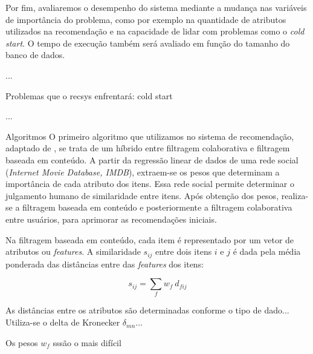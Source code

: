 Por fim, avaliaremos o desempenho do sistema mediante a mudança nas variáveis de importância do problema, como por exemplo na quantidade de atributos utilizados na recomendação e na capacidade de lidar com problemas como o \textit{cold start}. O tempo de execução também será avaliado em função do tamanho do banco de dados.

...

Problemas que o recsys enfrentará: cold start

...

Algoritmos
O primeiro algoritmo que utilizamos no sistema de recomendação, adaptado de  \cite{symeonidis2007feature}, se trata de um híbrido entre filtragem colaborativa e filtragem baseada em conteúdo. A partir da regressão linear de dados de uma rede social (\textit{Internet Movie Database, IMDB}), extraem-se os pesos que determinam a importância de cada atributo dos itens. Essa rede social permite determinar o julgamento humano de similaridade entre itens. Após obtenção dos pesos, realiza-se a filtragem baseada em conteúdo e posteriormente a filtragem colaborativa entre usuários, para aprimorar as recomendações iniciais.

Na filtragem baseada em conteúdo, cada item é representado por um vetor de atributos ou \textit{features}. A similaridade $s_{ij}$ entre dois itens $i$ e $j$ é dada pela média ponderada das distâncias entre das \textit{features} dos itens:

\begin{equation} 
    s_{ij} = \sum_{f}{w_{f} ~ d_{fij}}
\end{equation}

As distâncias entre os atributos são determinadas conforme o tipo de dado... Utiliza-se o delta de Kronecker $\delta_{mn}$...
 
Os pesos $w_f$ sssão o mais difícil 








